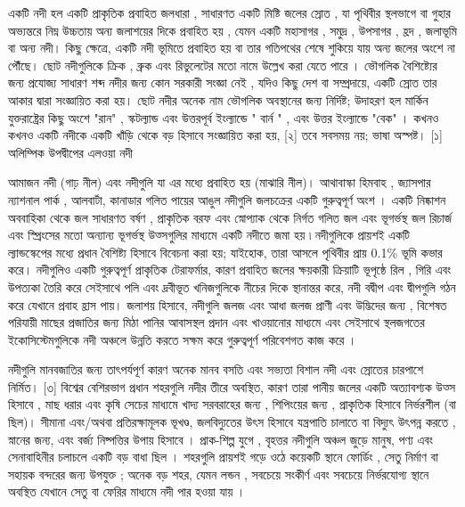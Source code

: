 \documentclass[a4paper,12pt,oneside,final]{article}
\begin{document}
একটি নদী হল একটি প্রাকৃতিক প্রবাহিত জলধারা , সাধারণত একটি মিষ্টি জলের স্রোত , যা পৃথিবীর স্থলভাগে বা গুহার অভ্যন্তরে নিম্ন উচ্চতায় অন্য জলাশয়ের দিকে প্রবাহিত হয় , যেমন একটি মহাসাগর , সমুদ্র , উপসাগর , হ্রদ , জলাভূমি বা অন্য নদী। কিছু ক্ষেত্রে, একটি নদী ভূমিতে প্রবাহিত হয় বা তার গতিপথের শেষে শুকিয়ে যায় অন্য জলের অংশে না পৌঁছে। ছোট নদীগুলিকে ক্রিক , ব্রুক এবং রিভুলেটের মতো নামে উল্লেখ করা যেতে পারে । ভৌগলিক বৈশিষ্ট্যের জন্য প্রযোজ্য সাধারণ শব্দ নদীর জন্য কোন সরকারী সংজ্ঞা নেই ,  যদিও কিছু দেশ বা সম্প্রদায়ে, একটি স্রোত তার আকার দ্বারা সংজ্ঞায়িত করা হয়। ছোট নদীর অনেক নাম ভৌগলিক অবস্থানের জন্য নির্দিষ্ট; উদাহরণ হল মার্কিন যুক্তরাষ্ট্রের কিছু অংশে "রান" , স্কটল্যান্ড এবং উত্তরপূর্ব ইংল্যান্ডে " বার্ন " , এবং উত্তর ইংল্যান্ডে "বেক" । কখনও কখনও একটি নদীকে একটি খাঁড়ি থেকে বড় হিসাবে সংজ্ঞায়িত করা হয়, [২] তবে সবসময় নয়; ভাষা অস্পষ্ট। [১]
অলিম্পিক উপদ্বীপের এলওয়া নদী
\par
আমাজন নদী (গাঢ় নীল) এবং নদীগুলি যা এর মধ্যে প্রবাহিত হয় (মাঝারি নীল)।
আথাবাস্কা হিমবাহ , জ্যাসপার ন্যাশনাল পার্ক , আলবার্টা, কানাডার গলিত পায়ের আঙুল
নদীগুলি জলচক্রের একটি গুরুত্বপূর্ণ অংশ । একটি নিষ্কাশন অববাহিকা থেকে জল সাধারণত বর্ষণ , প্রাকৃতিক বরফ এবং স্নোপ্যাক থেকে নির্গত গলিত জল এবং ভূগর্ভস্থ জল রিচার্জ এবং স্প্রিংসের মতো অন্যান্য ভূগর্ভস্থ উত্সগুলির মাধ্যমে একটি নদীতে জমা হয় ৷ নদীগুলিকে প্রায়শই একটি ল্যান্ডস্কেপের মধ্যে প্রধান বৈশিষ্ট্য হিসাবে বিবেচনা করা হয়; যাইহোক, তারা আসলে পৃথিবীর প্রায় 0.1\% ভূমি কভার করে। নদীগুলিও একটি গুরুত্বপূর্ণ প্রাকৃতিক টেরাফর্মার, কারণ প্রবাহিত জলের ক্ষয়কারী ক্রিয়াটি ভূপৃষ্ঠে রিল , গিরি এবং উপত্যকা তৈরি করে সেইসাথে পলি এবং দ্রবীভূত খনিজগুলিকে নীচের দিকে স্থানান্তর করে, নদী বদ্বীপ এবং দ্বীপগুলি গঠন করে যেখানে প্রবাহ হ্রাস পায়। জলাশয় হিসাবে, নদীগুলি জলজ এবং আধা জলজ প্রাণী এবং উদ্ভিদের জন্য , বিশেষত পরিযায়ী মাছের প্রজাতির জন্য মিঠা পানির আবাসস্থল প্রদান এবং খাওয়ানোর মাধ্যমে এবং সেইসাথে স্থলজগতের ইকোসিস্টেমগুলিকে নদী অঞ্চলে উন্নতি করতে সক্ষম করে গুরুত্বপূর্ণ পরিবেশগত কাজ করে ।
\par
নদীগুলি মানবজাতির জন্য তাৎপর্যপূর্ণ কারণ অনেক মানব বসতি এবং সভ্যতা বিশাল নদী এবং স্রোতের চারপাশে নির্মিত। [৩] বিশ্বের বেশিরভাগ প্রধান শহরগুলি নদীর তীরে অবস্থিত, কারণ তারা পানীয় জলের একটি অত্যাবশ্যক উত্স হিসাবে , মাছ ধরার এবং কৃষি সেচের মাধ্যমে খাদ্য সরবরাহের জন্য , শিপিংয়ের জন্য , প্রাকৃতিক হিসাবে নির্ভরশীল (বা ছিল)। সীমানা এবং/অথবা প্রতিরক্ষামূলক ভূখণ্ড, জলবিদ্যুতের উৎস হিসাবে যন্ত্রপাতি চালাতে বা বিদ্যুৎ উৎপন্ন করতে , স্নানের জন্য, এবং বর্জ্য নিষ্পত্তির উপায় হিসাবে । প্রাক-শিল্প যুগে , বৃহত্তর নদীগুলি অঞ্চল জুড়ে মানুষ, পণ্য এবং সেনাবাহিনীর চলাচলে একটি বড় বাধা ছিল । শহরগুলি প্রায়শই গড়ে ওঠে কয়েকটি স্থানে ফোর্ডিং , সেতু নির্মাণ বা সহায়ক বন্দরের জন্য উপযুক্ত ; অনেক বড় শহর, যেমন লন্ডন , সবচেয়ে সংকীর্ণ এবং সবচেয়ে নির্ভরযোগ্য স্থানে অবস্থিত যেখানে সেতু বা ফেরির মাধ্যমে নদী পার হওয়া যায় ।
\end{document}
